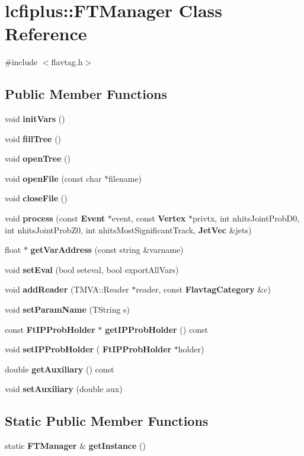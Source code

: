 \section{lcfiplus\+:\+:F\+T\+Manager Class Reference}
\label{classlcfiplus_1_1FTManager}


{\ttfamily \#include $<$flavtag.\+h$>$}

\subsection*{Public Member Functions}
\begin{DoxyCompactItemize}
\item 
void \textbf{ init\+Vars} ()
\item 
void \textbf{ fill\+Tree} ()
\item 
void \textbf{ open\+Tree} ()
\item 
void \textbf{ open\+File} (const char $\ast$filename)
\item 
void \textbf{ close\+File} ()
\item 
void \textbf{ process} (const \textbf{ Event} $\ast$event, const \textbf{ Vertex} $\ast$privtx, int nhits\+Joint\+Prob\+D0, int nhits\+Joint\+Prob\+Z0, int nhits\+Most\+Significant\+Track, \textbf{ Jet\+Vec} \&jets)
\item 
float $\ast$ \textbf{ get\+Var\+Address} (const string \&varname)
\item 
void \textbf{ set\+Eval} (bool seteval, bool export\+All\+Vars)
\item 
void \textbf{ add\+Reader} (T\+M\+V\+A\+::\+Reader $\ast$reader, const \textbf{ Flavtag\+Category} \&c)
\item 
void \textbf{ set\+Param\+Name} (T\+String s)
\item 
const \textbf{ Ft\+I\+P\+Prob\+Holder} $\ast$ \textbf{ get\+I\+P\+Prob\+Holder} () const
\item 
void \textbf{ set\+I\+P\+Prob\+Holder} (\textbf{ Ft\+I\+P\+Prob\+Holder} $\ast$holder)
\item 
double \textbf{ get\+Auxiliary} () const
\item 
void \textbf{ set\+Auxiliary} (double aux)
\end{DoxyCompactItemize}
\subsection*{Static Public Member Functions}
\begin{DoxyCompactItemize}
\item 
static \textbf{ F\+T\+Manager} \& \textbf{ get\+Instance} ()
\end{DoxyCompactItemize}


